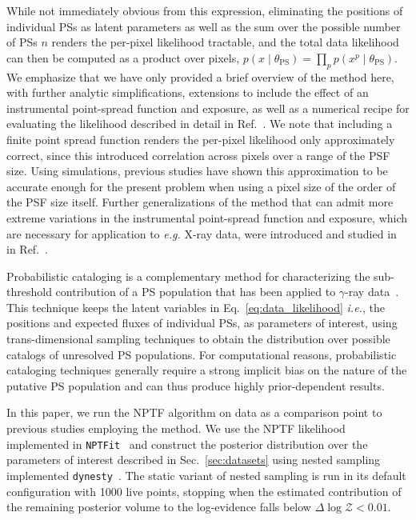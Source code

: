 \documentclass[prd,aps,10pt,nofootinbib,twocolumn,superscriptaddress,preprintnumbers,balancelastpage,longbibliography]{revtex4-1}
\begin{document}
While not immediately obvious from this expression, eliminating the positions of individual PSs as latent parameters as well as the sum over the possible number of PSs $n$ renders the per-pixel likelihood tractable, and the total data likelihood can then be computed as a product over pixels, $p(x\mid\theta_\mathrm{PS}) = \prod_{p} p(x^p\mid\theta_\mathrm{PS})$. We emphasize that we have only provided a brief overview of the method here, with further analytic simplifications, extensions to include the effect of an instrumental point-spread function and exposure, as well as a numerical recipe for evaluating the likelihood described in detail in Ref.~\cite{Mishra-Sharma:2016gis}. We note that including a finite point spread function renders the per-pixel likelihood only approximately correct, since this introduced correlation across pixels over a range of the PSF size. Using simulations, previous studies have shown this approximation to be accurate enough for the present problem when using a pixel size of the order of the PSF size itself. Further generalizations of the method that can admit more extreme variations in the instrumental point-spread function and exposure, which are necessary for application to \emph{e.g.} X-ray data, were introduced and studied in in Ref.~\cite{Collin:2021ufc}. 

Probabilistic cataloging is a complementary method for characterizing the sub-threshold contribution of a PS population that has been applied to $\gamma$-ray data~\cite{Daylan:2016tia}. This technique keeps the latent variables in Eq.~\eqref{eq:data_likelihood} \emph{i.e.}, the positions and expected fluxes of individual PSs, as parameters of interest, using trans-dimensional sampling techniques to obtain the distribution over possible catalogs of unresolved PS populations. For computational reasons, probabilistic cataloging techniques generally require a strong implicit bias on the nature of the putative PS population and can thus produce highly prior-dependent results.

In this paper, we run the NPTF algorithm on \Fermi data as a comparison point to previous studies employing the method. We use the NPTF likelihood implemented in \texttt{NPTFit}~\cite{Mishra-Sharma:2016gis} and construct the posterior distribution over the parameters of interest described in Sec.~\ref{sec:datasets} using nested sampling implemented \texttt{dynesty}~\cite{Speagle_2020}. The static variant of nested sampling is run in its default configuration with 1000 live points, stopping when the estimated contribution of the remaining posterior volume to the log-evidence falls below $\Delta \log \mathcal Z < 0.01$.
\end{document}
